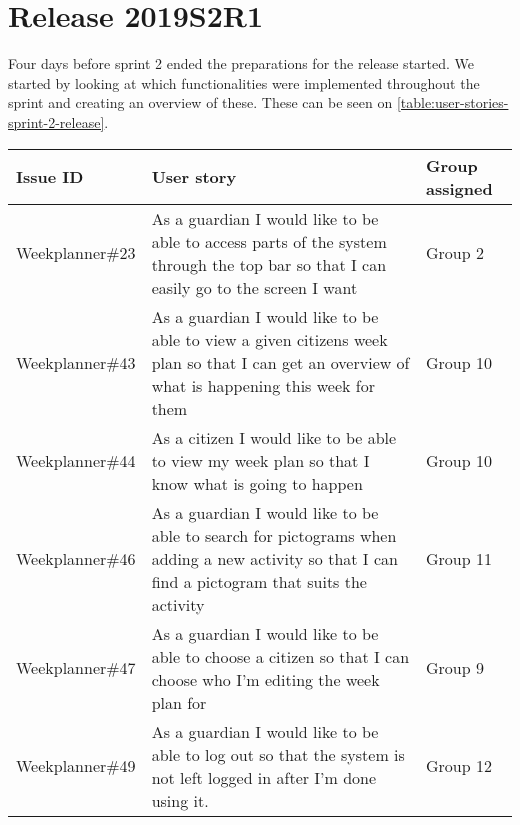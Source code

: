 \section{Release 2019S2R1}\label{sprint-2-release}
Four days before sprint 2 ended the preparations for the release started.
We started by looking at which functionalities were implemented throughout the sprint and creating an overview of these.
These can be seen on \autoref{table:user-stories-sprint-2-release}.

\begin{table}[H]
    \small
    \begin{tabular}{|p{2.8cm}|p{7cm}|p{2cm}|}
    \hline
    Issue ID        & User story                                                                                                                                                                               & Group assigned      \\ \hline
    Weekplanner\#23 & As a guardian I would like to be able to access parts of the system through the top bar so that I can easily go to the screen I want                                                     & Group 2             \\ \hline
    Weekplanner\#43 & As a guardian I would like to be able to view a given citizens week plan so that I can get an overview of what is happening this week for them                                           & Group 10            \\ \hline
    Weekplanner\#44 & As a citizen I would like to be able to view my week plan so that I know what is going to happen                                                                                         & Group 10            \\ \hline
    Weekplanner\#46 & As a guardian I would like to be able to search for pictograms when adding a new activity so that I can find a pictogram that suits the activity                                         & Group 11            \\ \hline
    Weekplanner\#47 & As a guardian I would like to be able to choose a citizen so that I can choose who I’m editing the week plan for                                                                         & Group 9             \\ \hline
    Weekplanner\#49 & As a guardian I would like to be able to log out so that the system is not left logged in after I’m done using it.                                                                       & Group 12            \\ \hline

\end{tabular}
\end{table}
